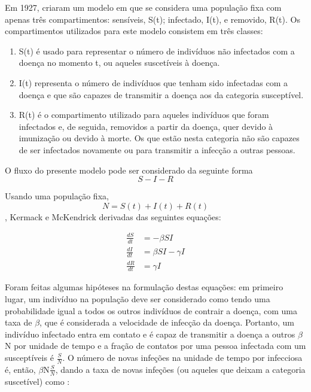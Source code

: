\documentclass[conference]{IEEEtran}
\begin{document}
Em 1927, \cite{kermack1927contribution} criaram um modelo em que se considera uma população fixa com apenas três compartimentos: sensíveis, S(t); infectado, I(t), e removido, R(t). Os compartimentos utilizados para este modelo consistem em três classes:\\
\begin{enumerate}
    \item S(t) é usado para representar o número de indivíduos não infectados com a doença no momento t, ou aqueles suscetíveis à doença.
    \item I(t) representa o número de indivíduos que tenham sido infectadas com a doença e que são capazes de transmitir a doença aos da categoria susceptível.
    \item R(t) é o compartimento utilizado para aqueles indivíduos que foram infectados e, de seguida, removidos a partir da doença, quer devido à imunização ou devido à morte. Os que estão nesta categoria não são capazes de ser infectados novamente ou para transmitir a infecção a outras pessoas.
\end{enumerate}
	O fluxo do presente modelo pode ser considerado da seguinte forma
	\begin{equation}
	    S - I - R
	\end{equation}

	Usando uma população fixa, 
	\begin{equation}
	    N=S(t)+I(t)+R(t)
	\end{equation}, Kermack e McKendrick derivadas das seguintes equações:
	
\begin{align}
    \frac{dS}{dt} &= -\beta SI\\
    \frac{dI}{dt} &= \beta SI - \gamma I\\
    \frac{dR}{dt} &= \gamma I
\end{align}

	 Foram feitas algumas hipóteses na formulação destas equações: em primeiro lugar, um indivíduo na população deve ser considerado como tendo uma probabilidade igual a todos os outros indivíduos de contrair a doença, com uma taxa de $\beta$, que é considerada a velocidade de infecção da doença. Portanto, um indivíduo infectado entra em contato e é capaz de transmitir a doença a outros $\beta$N por unidade de tempo e a fração de contatos por uma pessoa infectada com um susceptíveis é $\frac{S}{N}$. 
	O número de novas infeções na unidade de tempo por infecciosa é, então, $\beta$N$\frac{S}{N}$, dando a taxa de novas infeções (ou aqueles que deixam a categoria suscetível) como \cite{brauer2001mathematical}:
	
\end{document}
